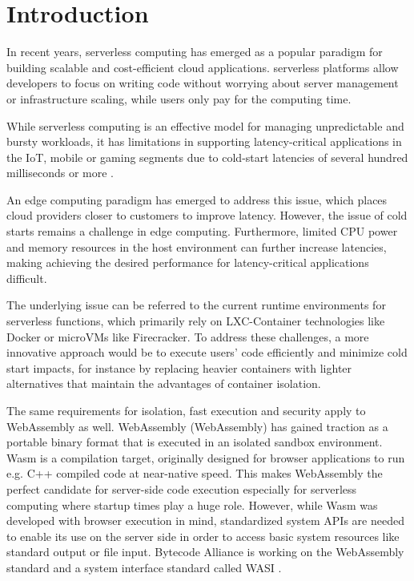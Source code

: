 \chapter{Introduction}
\label{chap:intro}

In recent years, \gls{serverless} computing has emerged as a popular paradigm for building scalable and cost-efficient cloud applications. \Gls{serverless} platforms allow developers to focus on writing code without worrying about server management or infrastructure scaling, while users only pay for the computing time.

While \gls{serverless} computing is an effective model for managing unpredictable and bursty
workloads, it has limitations in supporting latency-critical applications in the IoT, mobile or gaming segments due to cold-start latencies of several hundred milliseconds or more \cite{gackstatter_2022_pushing}. 

An \gls{edge computing} paradigm has emerged to address this issue, which places cloud providers closer to customers to improve latency. However, the issue of cold starts remains a challenge in edge computing. Furthermore, limited CPU power and memory resources in the host environment can further increase latencies, making achieving the desired performance for latency-critical applications difficult.

The underlying issue can be referred to the current runtime environments for \gls{serverless} functions, which primarily rely on \Gls{LXC-Container} technologies like Docker or microVMs like Firecracker. To address these challenges, a more innovative approach would be to execute users' code efficiently and minimize cold start impacts, for instance by replacing heavier containers with lighter alternatives that maintain the advantages of container isolation.

The same requirements for isolation, fast execution and security apply to WebAssembly as well. WebAssembly (\Gls{WebAssembly}) has gained traction as a portable binary format that is executed in an isolated sandbox environment. Wasm is a compilation target, originally designed for browser applications to run e.g. C++ compiled code at near-native speed. This makes WebAssembly the perfect candidate for server-side code execution especially for serverless computing where startup times play a huge role. However, while Wasm was developed with browser execution in mind, standardized system APIs are needed to enable its use on the server side in order to access basic system resources like standard output or file input. Bytecode Alliance is working on the WebAssembly standard and a system interface standard called WASI \cite{webassembly_2023_webassemblywasi}.

